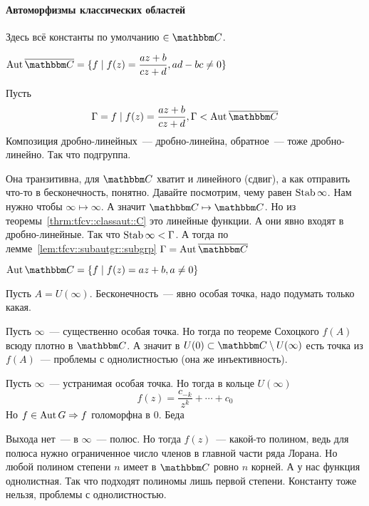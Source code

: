 \documentclass[12pt,timbord]{../../../notes}
\begin{document}
\paragraph{Автоморфизмы классических областей}
\label{par:tfcv::classaut}
Здесь всё константы по умолчанию $\in \C$.
\begin{thrm}\label{thrm:tfcv::classaut::exC}
  $\displaystyle \Aut \exC  = \{f \mid f(z) = \frac{az+b}{cz+d}, ad-bc \neq 0\}$
\end{thrm}
\begin{ittproof}
  Пусть \[
    \Gamma = {f\mid f(z) = \frac{{a z + b}}{cz+d}}, \Gamma < \Aut \exC
  \]
  Композиция дробно-линейных~--- дробно-линейна, обратное~--- тоже дробно-линейно. Так что
  подгруппа. 

  Она транзитивна, для $\C$ хватит и линейного (сдвиг), а как отправить что-то в бесконечность, понятно.
  Давайте посмотрим, чему равен $\operatorname{Stab} \infty$. Нам нужно чтобы $\infty \mapsto \infty$. А значит
  $\C \mapsto \C$. Но из теоремы~\ref{thrm:tfcv::classaut::C} это линейные функции. А они явно
  входят в дробно-линейные. Так что $\operatorname{Stab} \infty < \Gamma$. А тогда по
  лемме~\ref{lem:tfcv::subautgr::subgrp} $\Gamma = \Aut \exC$
\end{ittproof}

\begin{thrm}\label{thrm:tfcv::classaut::C}
  $\displaystyle \Aut \C  = \{f \mid f(z) = {az+b}, a\neq 0\}$
\end{thrm}
\begin{ittproof}
  Пусть $A = U(\infty)$. Бесконечность~--- явно особая точка, надо подумать только какая.
  
  Пусть $\infty$~--- существенно особая точка. Но тогда по теореме Сохоцкого $f(A)$ всюду плотно в
  $\C$. А значит в $U(0) \subset \C\setminus U(\infty)$ есть точка из $f(A)$~--- проблемы с
  однолистностью (она же инъективность).

  Пусть $\infty$~--- устранимая особая точка. Но тогда в кольце $U(\infty)$
  \[
    f(z) = \frac{c_{-k}}{z^k} + \dotsb + c_0
  \]
  Но $f\in  \operatorname{Aut} G \Rightarrow f$ голоморфна в $0$. Беда

  Выхода нет~--- в $\infty$~--- полюс. Но тогда $f(z)$~--- какой-то полином, ведь для полюса нужно
  ограниченное число  членов в главной части ряда Лорана. Но любой полином степени $n
  $ имеет в $\C$ ровно $n$ корней. А у нас функция однолистная. Так что подходят полиномы лишь
  первой степени. Константу тоже нельзя, проблемы с однолистностью. 
\end{ittproof}
\end{document}
